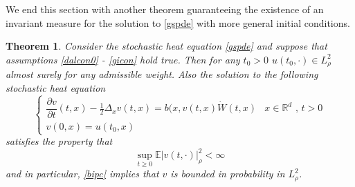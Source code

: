 \documentclass{article}
\newtheorem{theorem}{Theorem}[section]
\numberwithin{equation}{section}
\newcommand{\E}{\mathbb{E}}
\begin{document}
 We end this section with another theorem guaranteeing the existence of an invariant measure for the solution to \eqref{gspde} with more general initial conditions.  
 
\begin{theorem} \textit{Consider the stochastic heat equation \eqref{gspde} and suppose that assumptions \ref{dalcon0} - \ref{gicon} hold true. Then for any $t_0>0$ $u(t_0,\cdot)\in L^2_\rho$ almost surely for any admissible weight. Also the solution to the following stochastic heat equation
 \begin{equation}
 \begin{cases}
 \dfrac{\partial v}{\partial t}(t,x)-\frac{1}{2}\Delta_x v(t,x) = b(x,v(t,x)\dot W(t,x) & \text{$x\in \mathbb R^d$ , $t>0$}
 \\ v(0,x) = u(t_0,x)  & 
 \end{cases}  \label{vspde2}
 \end{equation}
 satisfies the property that 
 \begin{equation}
 \sup_{t\ge 0} \E |v(t,\cdot)|_\rho^2 < \infty \label{bipc}
 \end{equation}
 and in particular, \eqref{bipc} implies that $v$ is bounded in probability in $L^2_\rho$.} 
\end{theorem}
\end{document}
